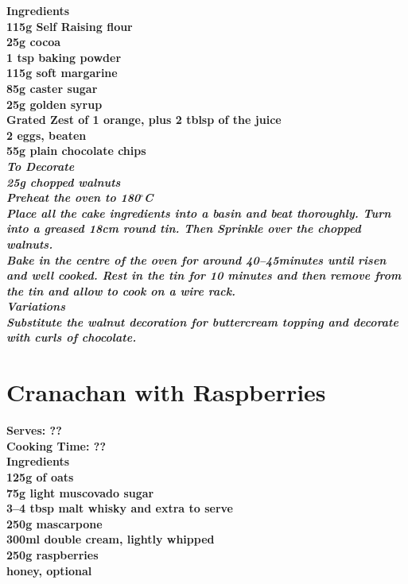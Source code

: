 \documentclass[18pt, oneside]{book}
\begin{document}
\bf{Ingredients} \normalfont \\ 
115g Self Raising flour \\
25g cocoa \\
1 tsp baking powder \\
115g soft margarine \\
85g caster sugar \\
25g golden syrup \\
Grated Zest of 1 orange, plus 2 tblsp of the juice \\
2 eggs, beaten \\
55g plain chocolate chips \\

\it{To Decorate} \normalfont \\
25g chopped walnuts \\

Preheat the oven to 180$^{\circ}$C \\

Place all the cake ingredients into a basin and beat thoroughly. Turn into a greased 18cm round tin. Then Sprinkle over the chopped walnuts. \\

Bake in the centre of the oven for around 40--45minutes until risen and well cooked. 
Rest in the tin for 10 minutes and then remove from the tin and allow to cook on a 
wire rack. \\

\bf{Variations} \normalfont \\
Substitute the walnut decoration for buttercream topping and decorate with curls 
of chocolate. 


\section{Cranachan with Raspberries}
\bf{Serves: ??} \\
\bf{Cooking Time: ??} \\

\bf{Ingredients} \normalfont \\ 
125g of oats \\
75g light muscovado sugar\\
3--4 tbsp malt whisky and extra to serve \\
250g mascarpone \\
300ml double cream, lightly whipped \\
250g raspberries \\
honey, optional \\
\end{document}
